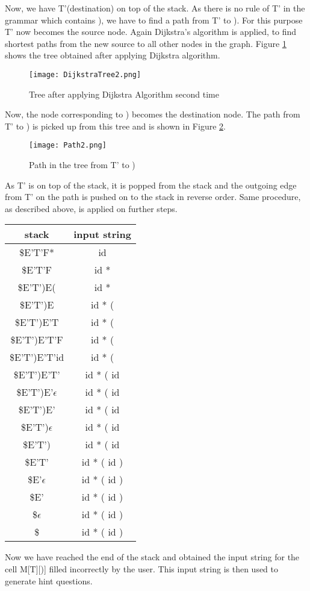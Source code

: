 \begin{example}
Now, we have T'(destination) on top of the stack. As there is no rule of T' in the grammar which contains ), we have to find a path from T' to ). For this purpose T' now becomes the source node. Again Dijkstra's algorithm is applied, to find shortest paths from the new source to all other nodes in the graph. Figure \ref{fig:Dijkstra Tree 2} shows the tree obtained after applying Dijkstra algorithm.
\begin{figure}
\centering
\texttt{[image: DijkstraTree2.png]}
\caption{Tree after applying Dijkstra Algorithm second time}
\label{fig:Dijkstra Tree 2}
\end{figure}

Now, the node corresponding to ) becomes the destination node. The path from T' to ) is picked up from this tree and is shown in Figure \ref{fig:Path 2}.
\begin{figure}
\centering
\texttt{[image: Path2.png]}
\caption{Path in the tree from T' to )}
\label{fig:Path 2}
\end{figure}

As T' is on top of the stack, it is popped from the stack and the outgoing edge from T' on the path is pushed on to the stack in reverse order. Same procedure, as described above, is applied on further steps.
\begin{center}
\begin{tabular}{ |c|c| } 
 \hline
 \textbf{stack} & \textbf{input string} \\
 \hline
 \$E'T'F* & id \\
 \$E'T'F & id * \\
 \$E'T')E( & id * \\
 \$E'T')E &	id * ( \\
 \$E'T')E'T & id * ( \\
 \$E'T')E'T'F &	id * ( \\
 \$E'T')E'T'id & id * ( \\
 \$E'T')E'T' & id * ( id \\
 \$E'T')E'$\epsilon$ & id * ( id \\
 \$E'T')E' & id * ( id \\
 \$E'T')$\epsilon$ & id * ( id \\
 \$E'T') & id * ( id \\
 \$E'T' & id * ( id ) \\
 \$E'$\epsilon$ & id * ( id ) \\
 \$E' & id * ( id ) \\
 \$$\epsilon$ & id * ( id ) \\
 \$ & id * ( id ) \\
 \hline
\end{tabular}
\end{center}

Now we have reached the end of the stack and obtained the input string for the cell M[T][)] filled incorrectly by the user. This input string is then used to generate hint questions.

\end{example}

